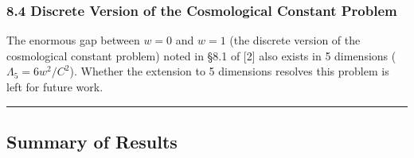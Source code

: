 \documentclass[a4paper,11pt]{article}
\theoremstyle{definition}
\begin{document}
\subsubsection{8.4 Discrete Version of the Cosmological Constant Problem}\label{discrete-version-of-the-cosmological-constant-problem}

The enormous gap between \(w = 0\) and \(w = 1\) (the discrete version of the cosmological constant problem) noted in §8.1 of {[}2{]} also exists in 5 dimensions (\(\Lambda_5 = 6w^2/C^2\)). Whether the extension to 5 dimensions resolves this problem is left for future work.

\begin{center}\rule{0.5\linewidth}{0.5pt}\end{center}

\subsection{Summary of Results}\label{summary-of-results}
\end{document}
